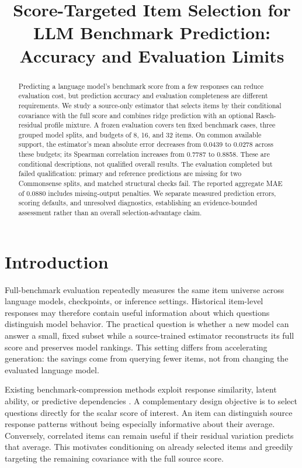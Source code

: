 \documentclass{article}
\title{Score-Targeted Item Selection for LLM Benchmark Prediction:\\Accuracy and Evaluation Limits}
\author{}
\begin{document}
\maketitle

\begin{abstract}
Predicting a language model's benchmark score from a few responses can reduce evaluation cost, but prediction accuracy and evaluation completeness are different requirements. We study a source-only estimator that selects items by their conditional covariance with the full score and combines ridge prediction with an optional Rasch-residual profile mixture. A frozen evaluation covers ten fixed benchmark cases, three grouped model splits, and budgets of 8, 16, and 32 items. On common available support, the estimator's mean absolute error decreases from 0.0439 to 0.0278 across these budgets; its Spearman correlation increases from 0.7787 to 0.8858. These are conditional descriptions, not qualified overall results. The evaluation completed but failed qualification: primary and reference predictions are missing for two Commonsense splits, and matched structural checks fail. The reported aggregate MAE of 0.0880 includes missing-output penalties. We separate measured prediction errors, scoring defaults, and unresolved diagnostics, establishing an evidence-bounded assessment rather than an overall selection-advantage claim.
\end{abstract}

\section{Introduction}
Full-benchmark evaluation repeatedly measures the same item universe across language models, checkpoints, or inference settings. Historical item-level responses may therefore contain useful information about which questions distinguish model behavior. The practical question is whether a new model can answer a small, fixed subset while a source-trained estimator reconstructs its full score and preserves model rankings. This setting differs from accelerating generation: the savings come from querying fewer items, not from changing the evaluated language model.

Existing benchmark-compression methods exploit response similarity, latent ability, or predictive dependencies \citep{Vivek2024,Polo2024,Kipnis2025,Pacchiardi2024,Li2025}. A complementary design objective is to select questions directly for the scalar score of interest. An item can distinguish source response patterns without being especially informative about their average. Conversely, correlated items can remain useful if their residual variation predicts that average. This motivates conditioning on already selected items and greedily targeting the remaining covariance with the full source score.
\end{document}
